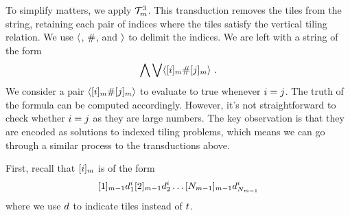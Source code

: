 To simplify matters, we apply $\psst^3_\expheight$. This transduction
removes the tiles from the string, retaining each pair of indices where
the tiles satisfy the vertical tiling relation. We use $\lmark$,
$\spacer$, and $\rmark$ to delimit the indices. We are left with a
string of the form
\[
    \bigwedge \bigvee \lmark
        \tenc{\expheight}{\idxi} \spacer \tenc{\expheight}{\idxj}
    \rmark \ .
\]
We consider a pair
$\lmark \tenc{\expheight}{\idxi} \spacer \tenc{\expheight}{\idxj} \rmark$
to evaluate to true whenever $\idxi = \idxj$. The truth of the formula
can be computed accordingly. However, it's not straightforward to check
whether $\idxi = \idxj$ as they are large numbers. The key observation
is that they are encoded as solutions to indexed tiling problems, which
means we can go through a similar process to the transductions above.

First, recall that $\tenc{\expheight}{\idxi}$ is of the form
\[
    \tenc{\expheight-1}{1} \vartile^\idxi_1
    \tenc{\expheight-1}{2} \vartile^\idxi_2
    \ldots
    \tenc{\expheight-1}{\nmax{\expheight-1}}
        \vartile^\idxi_{\nmax{\expheight-1}}
\]
where we use $\vartile$ to indicate tiles instead of $\tile$.


